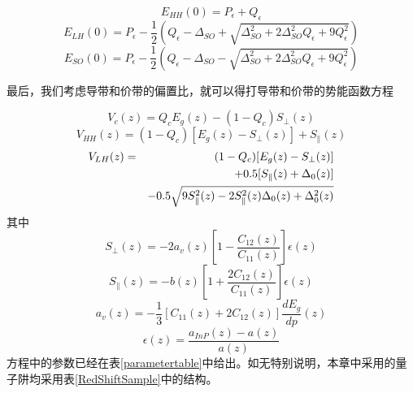 \documentclass{ZJUthesis}
\begin{document}
\begin{equation}
    E_{HH}(0) = P_{\epsilon} + Q_{\epsilon}
\end{equation}
\begin{equation}
    E_{LH}(0) = P_{\epsilon} - \frac{1}{2} \left( Q_{\epsilon} - \Delta_{SO} + \sqrt{\Delta^2_{SO} + 2 \Delta^2_{SO} Q_{\epsilon} + 9 Q^2_{\epsilon}} \right)
\end{equation}
\begin{equation}
    E_{SO}(0) = P_{\epsilon} - \frac{1}{2} \left( Q_{\epsilon} - \Delta_{SO} - \sqrt{\Delta^2_{SO} + 2 \Delta^2_{SO} Q_{\epsilon} + 9 Q^2_{\epsilon}} \right)
\end{equation}

最后，我们考虑导带和价带的偏置比，就可以得打导带和价带的势能函数方程

\begin{equation}
    \label{V_c}
    V_c(z) = Q_c E_g(z) - (1-Q_c)S_\perp(z)
\end{equation}
\begin{equation}
    \label{V_HH}
    V_{HH}(z) = (1-Q_c)[E_g(z) - S_\perp(z)] + S_\parallel(z)
\end{equation}
\begin{eqnarray}
    \label{V_LH}
    V_{LH}(z)&=& (1-Q_c)[E_g(z) - S_\perp(z)] \notag\\
    && +0.5[S_\parallel(z) + \Delta_0(z)] \notag\\
    && -0.5 \sqrt{9S_\parallel^2(z)-2S_\parallel^2(z)\Delta_0(z)+\Delta_0^2(z)}
\end{eqnarray}
其中
\begin{equation}
    \label{S_perp}
    S_\perp(z) = -2a_v(z)[1-\frac{C_{12}(z)}{C_{11}(z)}] \epsilon(z)
\end{equation}
\begin{equation}\label{S_parallel}
    S_\parallel(z) = -b(z)[1+\frac{2C_{12}(z)}{C_{11}(z)}] \epsilon(z)
\end{equation}
\begin{equation}\label{a_v}
    a_v(z) = -\frac{1}{3}[C_{11}(z)+2C_{12}(z)] \frac{dE_g}{dp}(z)
\end{equation}
\begin{equation}\label{epsilon}
    \epsilon(z) = \frac{a_{InP}(z)-a(z)}{a(z)}
\end{equation}
方程中的参数已经在表\ref{parametertable}中给出。如无特别说明，本章中采用的量子阱均采用表\ref{RedShiftSample}中的结构。
\end{document}
